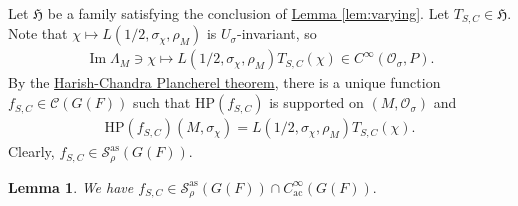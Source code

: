 \documentclass[10pt]{amsart}
\newtheorem{lemma}[theorem]{Lemma}
\theoremstyle{definition}
\numberwithin{equation}{section}
\numberwithin{equation}{subsection}
\renewcommand{\Im}{\mathop{\mathrm{Im}}}
\begin{document}
Let $\mathfrak{H}$ be a family satisfying the conclusion of \hyperref[lem:varying]{Lemma \ref{lem:varying}}. Let $T_{S,C}\in \mathfrak{H}.$ Note that $\chi\mapsto L(1/2,\sigma_\chi,\rho_M)$ is $U_\sigma$-invariant, so 
\begin{align*}
    \Im \Lambda_{M}\ni\chi\mapsto L(1/2,\sigma_\chi,\rho_M)T_{S,C}(\chi)\in C^\infty(\mathcal{O}_\sigma, P).
\end{align*}
By the %
\hyperref[HCPlan]{Harish-Chandra Plancherel theorem}, there is a unique function $f_{S,C}\in \mathcal{C}(G(F))$ such that $\mathrm{HP}(f_{S,C})$ is supported on $(M,\mathcal{O}_\sigma)$ and
\begin{align*}
    \mathrm{HP}(f_{S,C})(M,\sigma_\chi)=L(1/2,\sigma_\chi,\rho_M)T_{S,C}(\chi).
\end{align*}
Clearly, $f_{S,C}\in \mathcal{S}_\rho^{\mathrm{as}}(G(F)).$


\begin{lemma}\label{lem:cuspconst}
We have $f_{S,C}\in \mathcal{S}^{\mathrm{as}}_\rho(G(F))\cap C^\infty_{\mathrm{ac}}(G(F)).$
\end{lemma} 
\end{document}
